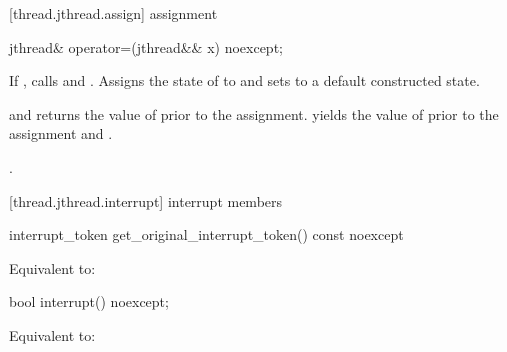 [thread.jthread.assign]{ assignment}

%
\begin{itemdecl}
jthread& operator=(jthread&& x) noexcept;
\end{itemdecl}

\begin{itemdescr}
\pnum
\effects If , calls  and .
Assigns the
state of  to  and sets  to a default constructed state.

{\color{diffcolor}
\pnum
\postconditions {} and  returns the value of
 prior to the assignment.
 yields the value of  prior to the assignment
and .
}%

\pnum
\returns {}.
\end{itemdescr}


[thread.jthread.interrupt]{ interrupt members}

{\color{diffcolor}
%
\begin{itemdecl}
interrupt_token get_original_interrupt_token() const noexcept
\end{itemdecl}
\begin{itemdescr}
  \pnum\effects Equivalent to: 
\end{itemdescr}

%
\begin{itemdecl}
bool interrupt() noexcept;
\end{itemdecl}
\begin{itemdescr}
  \pnum\effects Equivalent to: 
\end{itemdescr}
}%

%
%
%

